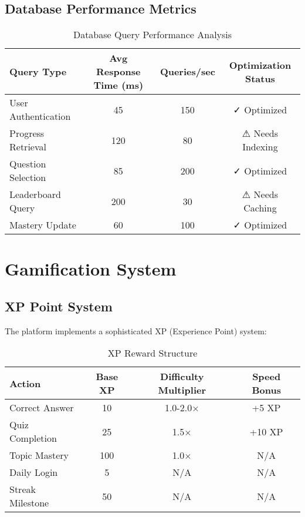 \documentclass[12pt,a4paper]{article}
\begin{document}
\subsection{Database Performance Metrics}

\begin{table}[H]
\centering
\caption{Database Query Performance Analysis}
\begin{tabular}{|l|c|c|c|}
\hline
\textbf{Query Type} & \textbf{Avg Response Time (ms)} & \textbf{Queries/sec} & \textbf{Optimization Status} \\
\hline
User Authentication & 45 & 150 & ✓ Optimized \\
\hline
Progress Retrieval & 120 & 80 & ⚠ Needs Indexing \\
\hline
Question Selection & 85 & 200 & ✓ Optimized \\
\hline
Leaderboard Query & 200 & 30 & ⚠ Needs Caching \\
\hline
Mastery Update & 60 & 100 & ✓ Optimized \\
\hline
\end{tabular}
\label{tab:db-performance}
\end{table}

\section{Gamification System}

\subsection{XP Point System}

The platform implements a sophisticated XP (Experience Point) system:

\begin{table}[H]
\centering
\caption{XP Reward Structure}
\begin{tabular}{|l|c|c|c|}
\hline
\textbf{Action} & \textbf{Base XP} & \textbf{Difficulty Multiplier} & \textbf{Speed Bonus} \\
\hline
Correct Answer & 10 & 1.0-2.0× & +5 XP \\
\hline
Quiz Completion & 25 & 1.5× & +10 XP \\
\hline
Topic Mastery & 100 & 1.0× & N/A \\
\hline
Daily Login & 5 & N/A & N/A \\
\hline
Streak Milestone & 50 & N/A & N/A \\
\hline
\end{tabular}
\label{tab:xp-system}
\end{table}
\end{document}
